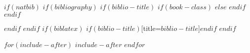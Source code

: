 \documentclass[$for(classoption)$$classoption$$sep$,$endfor$]{JASA}
\begin{document}






$if(natbib)$
$if(bibliography)$
$if(biblio-title)$
$if(book-class)$
\renewcommand\bibname{$biblio-title$}
$else$
\renewcommand\refname{$biblio-title$}
$endif$
$endif$

$endif$
$endif$
$if(biblatex)$
\printbibliography$if(biblio-title)$[title=$biblio-title$]$endif$
$endif$

$for(include-after)$
$include-after$
$endfor$
\end{document}
